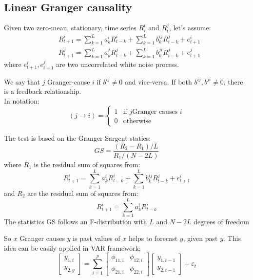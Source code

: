 \subsection{Linear Granger causality}
\begin{mydefinition}
	Given two zero-mean, stationary, time series $R^t_i$ and $R^j_t$, let's assume:
	\begin{align*}
		& R^i_{t+1} = \sum_{k=1}^{L} a^i_k R^i_{t-k} + \sum_{k=1}^{L} b_k^{ij}R_{t-k}^j + e^{i}_{t+1}\\
		& R^j_{t+1} = \sum_{k=1}^{L} a^j_k R^j_{t-k} + \sum_{k=1}^{L} b_k^{ji}R_{t-k}^j + e^{j}_{t+1}
	\end{align*}
where $e^i_{t+1}, e^j_{t+1}$ are two uncorrelated white noise process.\\
\end{mydefinition}
\begin{mydefinition}
We say that $j$ Granger-cause $i$ if $b^{ij} \neq 0$ and vice-versa. If both $b^{ij},b^{ji}\neq 0$, there is a feedback relationship.\\
In notation:
\[
(j \to i) = \begin{cases}
	1 & \text{if }j \text{Granger causes }i\\
	0 & \text{otherwise}
\end{cases}
\]
\end{mydefinition}
\begin{mytheorem}
	The test is based on the Granger-Sargent statics:
	\[
	GS = \frac{(R_2 -R_1)/L}{R_1/(N-2L)}
	\]
where $R_1$ is the residual sum of squares from:
\[
R_{t+1}^i = \sum_{k=1}^L a^i_kR^i_{t-k} + \sum_{k=1}^L b_k^{ij}R^j_{t-k} + e^i_{t+1}
\]
and $R_2$ are the residual sum of squares from:
\[
R^i_{t+1} = \sum_{k=1}^{L}a^i_k R^i_{t-k}
\]
The statistics GS follows an F-distribution with $L$ and $N-2L$ degrees of freedom
\end{mytheorem}
So $x$ Granger causes $y$ is past values of $x$ helps to forecast $y$, given past $y$. This idea can be easily applied in VAR framework;
\[
\begin{bmatrix}
	y_{1,t} \\
	y_{2,y}
\end{bmatrix}
=
\sum_{i=1}^{p} \begin{bmatrix}
	\phi_{11,i} & \phi_{12,i}\\
	\phi_{21,i} & \phi_{22,i}
\end{bmatrix}
\begin{bmatrix}
	y_{1,t-1} \\
	y_{2,t-1}
\end{bmatrix}
+ \varepsilon_t
\]
